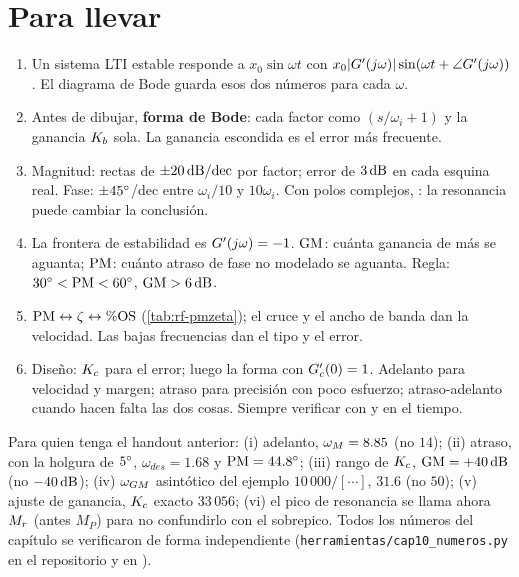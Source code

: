 \section{Para llevar}
\label{sec:rf-cierre}

\begin{parallevar}
\begin{enumerate}
  \item Un sistema LTI estable responde a $x_0\sin\omega t$ con $x_0|G'(j\omega)|\sin(\omega t+\angle G'(j\omega))$. El diagrama de Bode guarda esos dos números para cada $\omega$.
  \item Antes de dibujar, \textbf{forma de Bode}: cada factor como $(s/\omega_i+1)$ y la ganancia $K_b$ sola. La ganancia escondida es el error más frecuente.
  \item Magnitud: rectas de $\pm20\,\mathrm{dB/dec}$ por factor; error de $3\,\mathrm{dB}$ en cada esquina real. Fase: $\pm45^{\circ}$/dec entre $\omega_i/10$ y $10\omega_i$. Con polos complejos, : la resonancia puede cambiar la conclusión.
  \item La frontera de estabilidad es $G'(j\omega)=-1$. $\mathrm{GM}$: cuánta ganancia de más se aguanta; $\mathrm{PM}$: cuánto atraso de fase no modelado se aguanta. Regla: $30^{\circ}<\mathrm{PM}<60^{\circ}$, $\mathrm{GM}>6\,\mathrm{dB}$.
  \item $\mathrm{PM}\leftrightarrow\zeta\leftrightarrow\%\mathrm{OS}$ (\cref{tab:rf-pmzeta}); el cruce y el ancho de banda dan la velocidad. Las bajas frecuencias dan el tipo y el error.
  \item Diseño: $K_c$ para el error; luego la forma con $G_c'(0)=1$. Adelanto para velocidad y margen; atraso para precisión con poco esfuerzo; atraso-adelanto cuando hacen falta las dos cosas. Siempre verificar con  y en el tiempo.
\end{enumerate}
\end{parallevar}

\begin{profundiza}
Para quien tenga el handout anterior: (i) adelanto, $\omega_M=8.85$ (no $14$); (ii) atraso, con la holgura de $5^{\circ}$, $\omega_{des}=1.68$ y $\mathrm{PM}=44.8^{\circ}$; (iii) rango de $K_c$, $\mathrm{GM}=+40\,\mathrm{dB}$ (no $-40\,\mathrm{dB}$); (iv) $\omega_{GM}$ asintótico del ejemplo $10\,000/[\cdots]$, $31.6$ (no $50$); (v) ajuste de ganancia, $K_c$ exacto $33\,056$; (vi) el pico de resonancia se llama ahora $M_r$ (antes $M_P$) para no confundirlo con el sobrepico. Todos los números del capítulo se verificaron de forma independiente (\texttt{herramientas/cap10\_numeros.py} en el repositorio y  en \matlab).
\end{profundiza}

